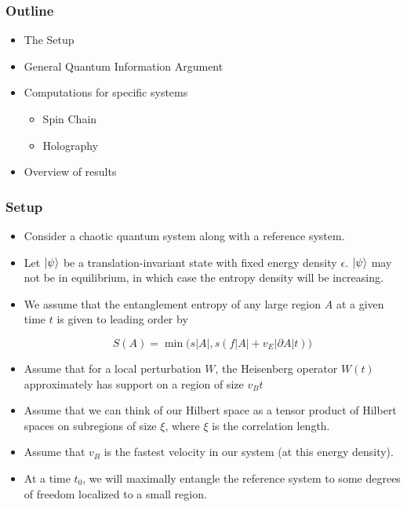 \documentclass[10pt,aspectratio=169]{beamer}
\begin{document}
\begin{frame}
\frametitle{Outline}

\begin{itemize}

\item The Setup

\item General Quantum Information Argument

\item Computations for specific systems

	\begin{itemize}
	
	\item Spin Chain 
	
	\item Holography	
	
	\end{itemize}
	
\item Overview of results

\end{itemize}

\end{frame}

\begin{frame}
\frametitle{Setup}

\begin{itemize}

\item Consider a chaotic quantum system along with a reference system.

\item Let $\ket{\psi}$ be a translation-invariant state with fixed energy density $\epsilon$. $\ket{\psi}$ may not be in equilibrium, in which case the entropy density will be increasing. 

\item We assume that the entanglement entropy of any large region $A$ at a given time $t$ is given to leading order by

\begin{equation}
S(A) = \min \bigg(s |A|, s \left(f |A| + v_E |\partial A| t \right) \bigg)
\end{equation}

\item Assume that for a local perturbation $W$, the Heisenberg operator $W(t)$ approximately has support on a region of size $v_B t$

\item Assume that we can think of our Hilbert space as a tensor product of Hilbert spaces on subregions of size $\xi$, where $\xi$ is the correlation length.

\item Assume that $v_B$ is the fastest velocity in our system (at this energy density).

\item At a time $t_0$, we will maximally entangle the reference system to some degrees of freedom localized to a small region.

\end{itemize}

\end{frame}
\end{document}
